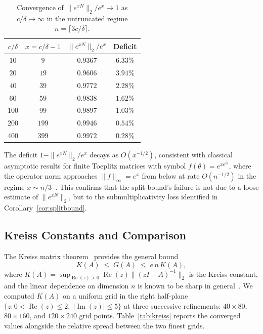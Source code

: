 \documentclass[11pt,reqno]{article}
\theoremstyle{plain}
\theoremstyle{definition}
\theoremstyle{remark}
\numberwithin{equation}{section}
\begin{document}
\begin{table}[ht]
\centering
\caption{Convergence of $\|e^{xN}\|_2/e^x \to 1$ as $c/\delta \to \infty$ in the untruncated regime $n = \lceil 3c/\delta \rceil$.}
\label{tab:toeplitz}
\begin{tabular}{cccc}
\toprule
$c/\delta$ & $x = c/\delta - 1$ & $\|e^{xN}\|_2 / e^x$ & Deficit \\
\midrule
$10$  & $9$   & $0.9367$ & $6.33\%$ \\
$20$  & $19$  & $0.9606$ & $3.94\%$ \\
$40$  & $39$  & $0.9772$ & $2.28\%$ \\
$60$  & $59$  & $0.9838$ & $1.62\%$ \\
$100$ & $99$  & $0.9897$ & $1.03\%$ \\
$200$ & $199$ & $0.9946$ & $0.54\%$ \\
$400$ & $399$ & $0.9972$ & $0.28\%$ \\
\bottomrule
\end{tabular}
\end{table}

The deficit $1 - \|e^{xN}\|_2/e^x$ decays as $O(x^{-1/2})$, consistent with classical asymptotic results for finite Toeplitz matrices with symbol $f(\theta) = e^{xe^{i\theta}}$, where the operator norm approaches $\|f\|_\infty = e^x$ from below at rate $O(n^{-1/2})$ in the regime $x \sim n/3$~\cite{Bottcher2006,Trefethen2005}. This confirms that the split bound's failure is not due to a loose estimate of $\|e^{xN}\|_2$, but to the submultiplicativity loss identified in Corollary~\ref{cor:splitbound}.

\subsection{Kreiss Constants and Comparison}\label{subsec:kreiss}

The Kreiss matrix theorem~\cite{Kreiss1962,Spijker1991} provides the general bound
\begin{equation}\label{eq:kreiss_theorem}
  K(A) \;\le\; G(A) \;\le\; e\,n\,K(A),
\end{equation}
where $K(A) = \sup_{\operatorname{Re}(z)>0} \operatorname{Re}(z)\|(zI-A)^{-1}\|_2$ is the Kreiss constant, and the linear dependence on dimension $n$ is known to be sharp in general~\cite{Spijker1991}. We computed $K(A)$ on a uniform grid in the right half-plane $\{z : 0 < \operatorname{Re}(z) \le 2,\; |\operatorname{Im}(z)| \le 5\}$ at three successive refinements: $40\times 80$, $80\times 160$, and $120\times 240$ grid points. Table~\ref{tab:kreiss} reports the converged values alongside the relative spread between the two finest grids.
\end{document}
